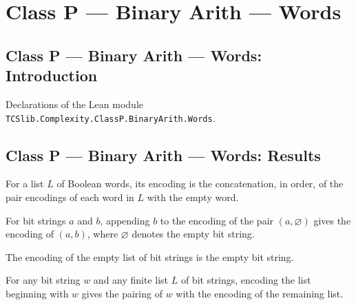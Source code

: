 \section{Class P --- Binary Arith --- Words}
\subsection*{Class P --- Binary Arith --- Words: Introduction}

Declarations of the Lean module \texttt{TCSlib.Complexity.ClassP.BinaryArith.Words}.

\subsection*{Class P --- Binary Arith --- Words: Results}

\begin{definition}
\label{Complexity.BinArith.encWords}
\leanok
{}
For a list $L$ of Boolean words, its encoding is the concatenation, in order, of the
pair encodings of each word in $L$ with the empty word.
\end{definition}

\begin{theorem}
\label{Complexity.BinArith.pairEncode_nil_append}
\leanok
{}
For bit strings $a$ and $b$, appending $b$ to the encoding of the pair $(a,\varnothing)$
gives the encoding of $(a,b)$, where $\varnothing$ denotes the empty bit string.
\end{theorem}

\begin{theorem}
\label{Complexity.BinArith.encWords_nil}
\leanok
{}
The encoding of the empty list of bit strings is the empty bit string.
\end{theorem}

\begin{theorem}
\label{Complexity.BinArith.encWords_cons}
\leanok
{}
For any bit string $w$ and any finite list $L$ of bit strings, encoding the list
beginning with $w$ gives the pairing of $w$ with the encoding of the remaining list.
\end{theorem}

